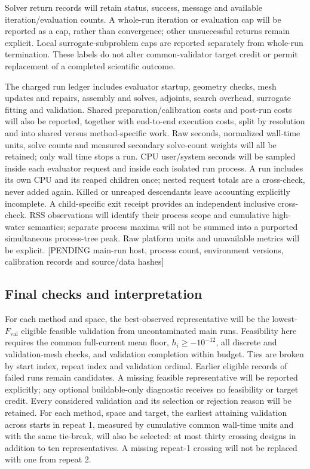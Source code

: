 Solver return records will retain status, success, message and available
iteration/evaluation counts. A whole-run iteration or evaluation cap will be
reported as a cap, rather than convergence; other unsuccessful returns remain
explicit. Local surrogate-subproblem caps are reported separately from whole-run
termination. These labels do not alter common-validator target credit or permit
replacement of a completed scientific outcome.

The charged run ledger includes evaluator startup, geometry checks, mesh
updates and repairs, assembly and solves, adjoints, search overhead,
surrogate fitting and validation. Shared preparation/calibration costs and
post-run costs will also be reported, together with end-to-end execution
costs, split by resolution and into shared versus method-specific work.
Raw seconds, normalized wall-time units, solve counts and measured secondary
solve-count weights will all be retained; only wall time stops a run.
CPU user/system seconds will be sampled inside each evaluator request and
inside each isolated run process. A run includes its own CPU and its reaped
children once; nested request totals are a cross-check, never added again.
Killed or unreaped descendants leave accounting explicitly incomplete.
A child-specific exit receipt provides an independent inclusive cross-check.
RSS observations will identify their process scope and cumulative high-water
semantics; separate process maxima will not be summed into a purported
simultaneous process-tree peak. Raw platform units and unavailable metrics
will be explicit. [PENDING main-run host, process count,
environment versions, calibration records and source/data hashes]

\subsection{Final checks and interpretation}

For each method and space, the best-observed representative will be the
lowest-$F_{\mathrm{val}}$ eligible feasible validation from uncontaminated
main runs. Feasibility here requires the common full-current mean floor,
$h_i\geq-10^{-12}$, all discrete and validation-mesh checks, and validation completion
within budget. Ties are broken by start
index, repeat index and validation ordinal. Earlier eligible records of
failed runs remain candidates. A missing feasible representative will be
reported explicitly; any optional buildable-only diagnostic receives no
feasibility or target credit. Every considered validation and its selection
or rejection reason will be retained. For each method, space and target, the earliest attaining
validation across starts in repeat 1, measured by cumulative common
wall-time units and with the same tie-break, will also be selected: at most thirty
crossing designs in addition to ten representatives. A missing repeat-1
crossing will not be replaced with one from repeat 2.


